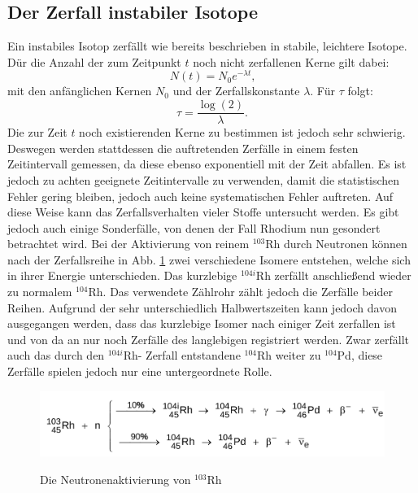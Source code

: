  \subsection{Der Zerfall instabiler Isotope}
 Ein instabiles Isotop zerfällt wie bereits beschrieben in stabile, leichtere Isotope. Dür die Anzahl der zum Zeitpunkt $t$ noch nicht zerfallenen Kerne gilt dabei:
 \begin{equation}
   N(t) = N_0 e^{-\lambda t}\text{,}
   \end{equation}
mit den anfänglichen Kernen $N_0$ und der Zerfallskonstante $\lambda$.
Für $\tau$ folgt:
\begin{equation}
  \tau = \frac{\log(2)}{\lambda}\text{.}\label{T}
\end{equation}
Die zur Zeit $t$ noch existierenden Kerne zu bestimmen ist jedoch sehr schwierig.
Deswegen werden stattdessen die auftretenden Zerfälle in einem festen Zeitintervall gemessen, da diese ebenso exponentiell mit der Zeit abfallen.
Es ist jedoch zu achten geeignete Zeitintervalle zu verwenden, damit die statistischen Fehler gering bleiben, jedoch auch keine systematischen Fehler auftreten.
Auf diese Weise kann das Zerfallsverhalten vieler Stoffe untersucht werden.
Es gibt jedoch auch einige Sonderfälle, von denen der Fall Rhodium nun gesondert betrachtet wird.
Bei der Aktivierung von reinem $^{103}$Rh durch Neutronen können nach der Zerfallsreihe in Abb. \ref{fig:rod}
zwei verschiedene Isomere entstehen, welche sich in ihrer Energie unterschieden. Das kurzlebige $^{104i}$Rh zerfällt anschließend wieder zu normalem $^{104}$Rh.
Das verwendete Zählrohr zählt jedoch die Zerfälle beider Reihen. Aufgrund der sehr unterschiedlich Halbwertszeiten kann jedoch davon ausgegangen werden, dass das kurzlebige Isomer nach einiger Zeit zerfallen ist und von da an nur noch Zerfälle des langlebigen registriert werden. Zwar zerfällt auch das durch den $^{104i}$Rh- Zerfall entstandene $^{104}$Rh weiter zu $^{104}$Pd, diese Zerfälle spielen jedoch nur eine untergeordnete Rolle.
\begin{figure}
 \centering
 \caption{Die Neutronenaktivierung von $^{103}$Rh \cite{V702}}
 \includegraphics[width=\linewidth-150pt,height=\textheight-150pt,keepaspectratio]{content/rhodium.png}
 \label{fig:rod}
\end{figure}
